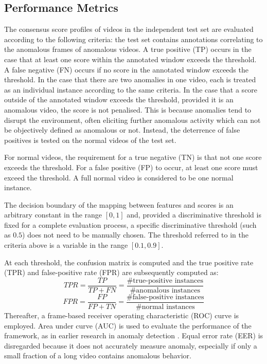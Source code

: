 \documentclass[sigplan,authorversion,nonacm, 9pt]{acmart}
\begin{document}
\subsection{Performance Metrics}
The consensus score profiles of videos in the independent test set are evaluated according to the following criteria: the test set contains annotations correlating to the anomalous frames of anomalous videos. A true positive (TP) occurs in the case that at least one score within the annotated window exceeds the threshold. A false negative (FN) occurs if no score in the annotated window exceeds the threshold. In the case that there are two anomalies in one video, each is treated as an individual instance according to the same criteria. In the case that a score outside of the annotated window exceeds the threshold, provided it is an anomalous video, the score is not penalised. This is because anomalies tend to disrupt the environment, often eliciting further anomalous activity which can not be objectively defined as anomalous or not. Instead, the deterrence of false positives is tested on the normal videos of the test set.
\par
For normal videos, the requirement for a true negative (TN) is that not one score exceeds the threshold. For a false positive (FP) to occur, at least one score must exceed the threshold. A full normal video is considered to be one normal instance.
\par
The decision boundary of the mapping between features and scores is an arbitrary constant in the range $[0, 1]$ and, provided a discriminative threshold is fixed for a complete evaluation process, a specific discriminative threshold (such as $0.5$) does not need to be manually chosen.
The threshold referred to in the criteria above is a variable in the range $[0.1, 0.9]$. 
\par
At each threshold, the confusion matrix is computed and the true positive rate (TPR) and false-positive rate (FPR) are subsequently computed as:
\begin{equation}
    TPR = \frac{TP}{TP + FN} = \frac{\# \text{true-positive instances}}{\# \text{anomalous instances}}
\end{equation}
\begin{equation}
    FPR = \frac{FP}{FP + TN} = \frac{\# \text{false-positive instances}}{\# \text{normal instances}}
\end{equation}
Thereafter, a frame-based receiver operating characteristic (ROC) curve is employed. Area under curve (AUC) \cite{auc} is used to evaluate the performance of the framework, as in earlier research in anomaly detection \cite{crowdedscenes}.
Equal error rate (EER) \cite{crowdedscenes} is disregarded because it does not accurately measure anomaly, especially if only a small fraction of a long video contains anomalous behavior.
\end{document}
